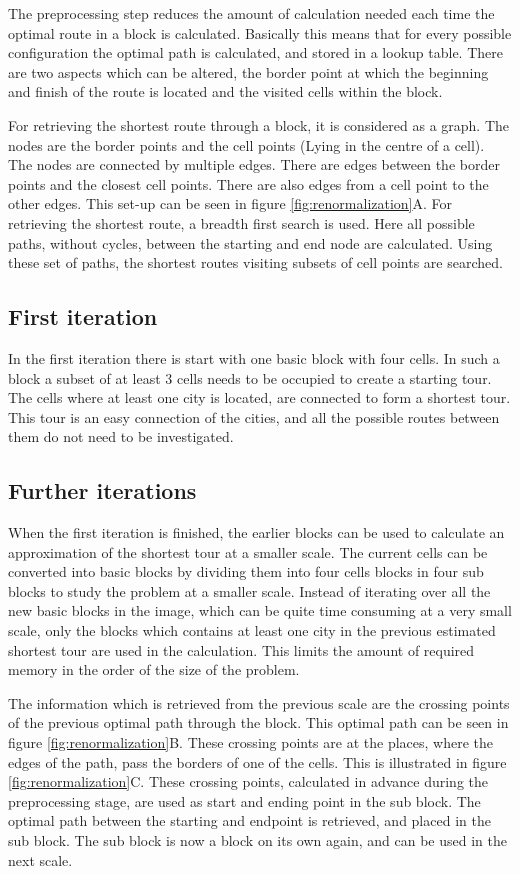 The preprocessing step reduces the amount of calculation needed each time the 
optimal route in a block is calculated. Basically this means that for
every possible configuration the optimal path is calculated, and stored in
a lookup table. There are two aspects which can be altered, the border point
at which the beginning and finish of the route is located and the visited
cells within the block.

For retrieving the shortest route through a block, it is considered as a
graph. The nodes are the border points and the cell points (Lying in the
centre of a cell). The nodes are connected by multiple edges. There are edges
between the border points and the closest cell points. There are also edges
from a cell point to the other edges. This set-up can be seen in figure
\ref{fig:renormalization}A. For retrieving the shortest route, a breadth first
search is used. Here all possible paths, without cycles, between the starting
and end node are calculated. Using these set of paths, the shortest routes
visiting subsets of cell points are searched.

\subsection{First iteration}
In the first iteration there is start with one basic block with four cells. In such a
block a subset of at least 3 cells needs to be occupied to create a starting
tour. The cells where at least one city is located, are connected to form a
shortest tour. This tour is an easy connection of the cities, and all the
possible routes between them do not need to be investigated.

\subsection{Further iterations}
When the first iteration is finished, the earlier blocks can be used to calculate an
approximation of the shortest tour at a smaller scale. The current cells can be 
converted into basic blocks by dividing them into four cells blocks in four sub
 blocks to study the problem at a smaller scale. Instead of
iterating over all the new basic blocks in the image, which can be quite time
consuming at a very small scale, only the blocks which contains at least
one city in the previous estimated shortest tour are used in the calculation.
This limits the amount of required memory in the order of the size of the problem.

The information which is retrieved from the previous scale are the crossing
points of the previous optimal path through the block. This optimal path can
be seen in figure \ref{fig:renormalization}B.  These crossing points are at
the places, where the edges of the path, pass the borders of one of the cells.
This is illustrated in figure \ref{fig:renormalization}C. These crossing
points, calculated in advance during the preprocessing stage, are used as start and
ending point in the sub block. The optimal path between the starting and
endpoint is retrieved, and placed in the sub block. The sub block is now a block
on its own again, and can be used in the next scale.

